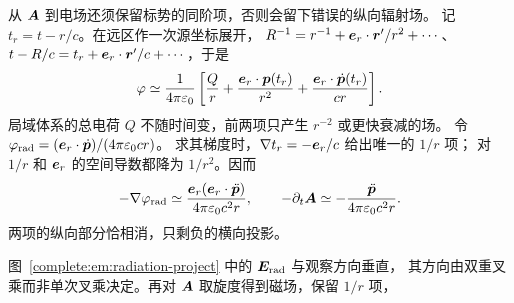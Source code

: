 从 $\bm{A}$ 到电场还须保留标势的同阶项，否则会留下错误的纵向辐射场。
记 $t_r=t-r/c$。在远区作一次源坐标展开，
$R^{-1}=r^{-1}+\bm{e}_r\cdot\bm{r}'/r^2+\cdots$、
$t-R/c=t_r+\bm{e}_r\cdot\bm{r}'/c+\cdots$，于是
\[
 \varphi\simeq\frac1{4\pi\varepsilon_0}
 \left[\frac Qr+\frac{\bm{e}_r\cdot\bm{p}(t_r)}{r^2}
 +\frac{\bm{e}_r\cdot\dot{\bm{p}}(t_r)}{cr}\right].
\]
局域体系的总电荷 $Q$ 不随时间变，前两项只产生 $r^{-2}$ 或更快衰减的场。
令 $\varphi_{\rm rad}=(\bm{e}_r\cdot\dot{\bm{p}})/(4\pi\varepsilon_0cr)$。
求其梯度时，$\nabla t_r=-\bm{e}_r/c$ 给出唯一的 $1/r$ 项；
对 $1/r$ 和 $\bm{e}_r$ 的空间导数都降为 $1/r^2$。因而
\[
 -\nabla\varphi_{\rm rad}\simeq
 \frac{\bm{e}_r(\bm{e}_r\cdot\ddot{\bm{p}})}{4\pi\varepsilon_0c^2r},
 \qquad
 -\partial_t\bm{A}\simeq
 -\frac{\ddot{\bm{p}}}{4\pi\varepsilon_0c^2r}.
\]
两项的纵向部分恰相消，只剩负的横向投影。

\begin{qualityfigure}
\end{qualityfigure}

图~\ref{complete:em:radiation-project} 中的 $\bm{E}_{\rm rad}$ 与观察方向垂直，
其方向由双重叉乘而非单次叉乘决定。再对 $\bm{A}$ 取旋度得到磁场，保留 $1/r$ 项，
